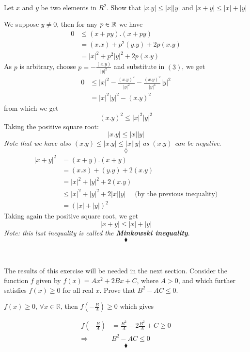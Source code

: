 \subsection{}
\begin{tcolorbox}
Let $x$ and $y$ be two elements in $R^2$. Show that $|x. y|\leq |x||y|$ and $|x+y|\leq |x|+|y|$
\end{tcolorbox}
We suppose $y\neq 0$, then for any $p\in \mathbb{R}$ we have
\begin{align}
0&\leq (x+py).(x+py)\\
&= (x.x) + p^2(y.y)+2p(x.y)\\
&=|x|^2+p^2|y|^2+2p(x.y)
\end{align}
As $p$ is arbitrary, choose $p= -\frac{(x.y)}{|y|^2}$ and substitute in $(3)$, we get 
\begin{align*}
0&\leq|x|^2-\frac{(x.y)^2}{|y|^2}-\frac{(x.y)^2}{|y|^4}|y|^2\\
&= |x|^2|y|^2-(x.y)^2
\end{align*}
from which we get 
$$(x.y)^2\leq |x|^2|y|^2$$
Taking the positive square root:
$$|x.y|\leq |x||y|$$
\textit{Note that we have also $(x.y)\leq |x.y|\leq |x||y|$ as $(x.y)$ can be negative}.
$$\lozenge$$
\begin{align*}
|x+y|^2&= (x+y).(x+y)\\
&= (x.x)+(y.y)+2(x.y)\\
&= |x|^2+|y|^2+2(x.y)\\
&\leq |x|^2+|y|^2+2|x||y|\quad\text{ (by the previous inequality)}\\
&= \left(|x|+|y|\right)^2
\end{align*}
Taking again the positive square root, we get 
$$|x+y|\leq |x|+|y|$$
\textit{Note: this last inequality is called the \textbf{Minkowski inequality}}.
$$\blacklozenge$$\\
\subsection{}
\begin{tcolorbox}
The results of this exercise will be needed in the next section. Consider the function $f$ given by $f (x) = A x^2+ 2Bx+ C$, where $A>0$, and which further satisfies $f(x) \geq 0$ for all real $x$. Prove that $B^2-AC\leq 0$. 
\end{tcolorbox}
 $f(x)\geq 0,\, \forall x\in \mathbb{R}$, then $f(-\frac{B}{A})\geq 0$ which gives

\begin{align*}f(-\frac{B}{A})&= \frac{B^2}{A}-2\frac{B^2}{A}+C \geq 0\\
\Rightarrow\quad &B^2-AC \leq 0
\end{align*}
$$\blacklozenge$$
\newpage

